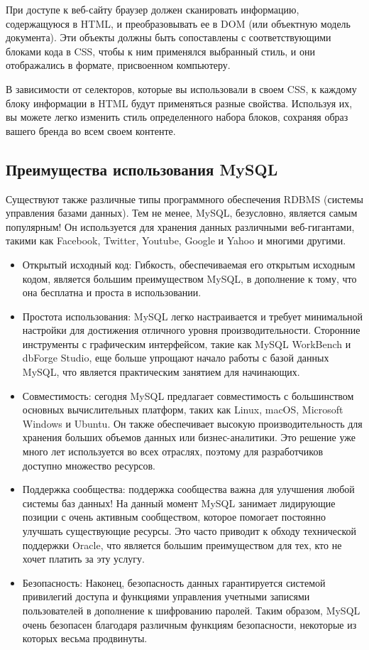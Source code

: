 При доступе к веб-сайту браузер должен сканировать информацию, содержащуюся в HTML, и преобразовывать ее в DOM (или объектную модель документа). Эти объекты должны быть сопоставлены с соответствующими блоками кода в CSS, чтобы к ним применялся выбранный стиль, и они отображались в формате, присвоенном компьютеру.

В зависимости от селекторов, которые вы использовали в своем CSS, к каждому блоку информации в HTML будут применяться разные свойства. Используя их, вы можете легко изменить стиль определенного набора блоков, сохраняя образ вашего бренда во всем своем контенте.


\subsection{Преимущества использования MySQL}

Существуют также различные типы программного обеспечения RDBMS (системы управления базами данных). Тем не менее, MySQL, безусловно, является самым популярным! Он используется для хранения данных различными веб-гигантами, такими как Facebook, Twitter, Youtube, Google и Yahoo и многими другими.

\begin{itemize}
\item Открытый исходный код: Гибкость, обеспечиваемая его открытым исходным кодом, является большим преимуществом MySQL, в дополнение к тому, что она бесплатна и проста в использовании.

\item Простота использования: MySQL легко настраивается и требует минимальной настройки для достижения отличного уровня производительности. Сторонние инструменты с графическим интерфейсом, такие как MySQL WorkBench и dbForge Studio, еще больше упрощают начало работы с базой данных MySQL, что является практическим занятием для начинающих.

\item Совместимость: сегодня MySQL предлагает совместимость с большинством основных вычислительных платформ, таких как Linux, macOS, Microsoft Windows и Ubuntu. Он также обеспечивает высокую производительность для хранения больших объемов данных или бизнес-аналитики. Это решение уже много лет используется во всех отраслях, поэтому для разработчиков доступно множество ресурсов.

\item Поддержка сообщества: поддержка сообщества важна для улучшения любой системы баз данных! На данный момент MySQL занимает лидирующие позиции с очень активным сообществом, которое помогает постоянно улучшать существующие ресурсы. Это часто приводит к обходу технической поддержки Oracle, что является большим преимуществом для тех, кто не хочет платить за эту услугу.

\item Безопасность: Наконец, безопасность данных гарантируется системой привилегий доступа и функциями управления учетными записями пользователей в дополнение к шифрованию паролей. Таким образом, MySQL очень безопасен благодаря различным функциям безопасности, некоторые из которых весьма продвинуты.
\end{itemize}

